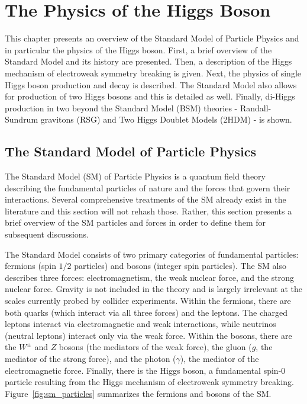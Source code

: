
\chapter{The Physics of the Higgs Boson}

This chapter presents an overview of the Standard Model of Particle Physics and in particular the physics of the Higgs boson. First, a brief overview of the Standard Model and its history are presented. Then, a description of the Higgs mechanism of electroweak symmetry breaking is given. Next, the physics of single Higgs boson production and decay is described. The Standard Model also allows for production of two Higgs bosons and this is detailed as well. Finally, di-Higgs production in two beyond the Standard Model (BSM) theories - Randall-Sundrum gravitons (RSG) and Two Higgs Doublet Models (2HDM) - is shown. 

\section{The Standard Model of Particle Physics}

The Standard Model (SM) of Particle Physics is a quantum field theory describing the fundamental particles of nature and the forces that govern their interactions. Several comprehensive treatments of the SM already exist in the literature\cite{Griffiths,HalzenAndMartin,Tully,PDG,Schwartz,Dawson} and this section will not rehash those. Rather, this section presents a brief overview of the SM particles and forces in order to define them for subsequent discussions. 

The Standard Model consists of two primary categories of fundamental particles: fermions (spin $1/2$ particles) and bosons (integer spin particles). The SM also describes three forces: electromagnetism, the weak nuclear force, and the strong nuclear force. Gravity is not included in the theory and is largely irrelevant at the scales currently probed by collider experiments. Within the fermions, there are both quarks (which interact via all three forces) and the leptons. The charged leptons interact via electromagnetic and weak interactions, while neutrinos (neutral leptons) interact only via the weak force. Within the bosons, there are the $W^{\pm}$ and $Z$ bosons (the mediators of the weak force), the gluon ($g$, the mediator of the strong force), and the photon ($\gamma$), the mediator of the electromagnetic force. Finally, there is the Higgs boson, a fundamental spin-$0$ particle resulting from the Higgs mechanism of electroweak symmetry breaking.  Figure~\ref{fig:sm_particles} summarizes the fermions and bosons of the SM. 

